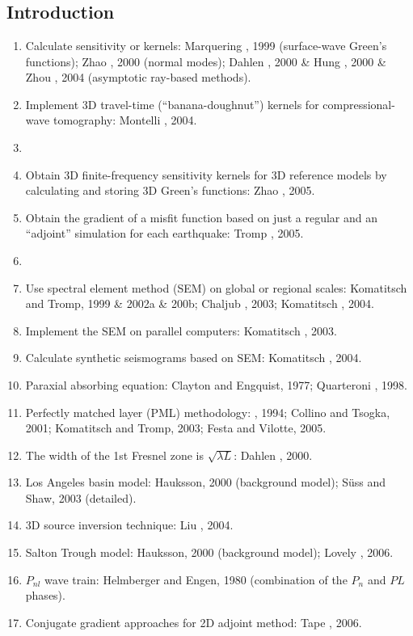 \renewcommand{\pmk}{Liu\_2006\_BSSA\_Finite-frequency kernels}
\renewcommand{\prf}{FWI/\pmk.pdf}
\renewcommand{\pti}{Finite-frequency kernels based on adjoint methods}
\renewcommand{\pay}{Qinya Liu and Jeroen Tromp, 2006}
\renewcommand{\pjo}{Bulletin of the Seismological Society of America}
\renewcommand{\pda}{2016/12/23 Fri.}

\section{\pinfo}
\subsection{Introduction}
\begin{enumerate}[\hspace{10mm}*]
  \item Calculate sensitivity or \Frechet kernels:
    Marquering \etal, 1999 (surface-wave Green's functions);
    Zhao \etal, 2000 (normal modes);
    Dahlen \etal, 2000 \& Hung \etal, 2000 \& Zhou \etal, 2004 (asymptotic ray-based methods).
  \item Implement 3D travel-time (``banana-doughnut'') kernels for compressional-wave tomography:
    Montelli \etal, 2004.
  \item \sline
  \item Obtain 3D finite-frequency sensitivity kernels for 3D reference models
    by calculating and storing 3D Green's functions: Zhao \etal, 2005.
  \item Obtain the gradient of a misfit function based on
    just a regular and an ``adjoint'' simulation for each earthquake: Tromp \etal, 2005.
  \item \sline
  \item Use spectral element method (SEM) on global or regional scales:
    Komatitsch and Tromp, 1999 \& 2002a \& 200b; Chaljub \etal, 2003; Komatitsch \etal, 2004.
  \item Implement the SEM on parallel computers: Komatitsch \etal, 2003.
  \item Calculate synthetic seismograms based on SEM: Komatitsch \etal, 2004.
  \item Paraxial absorbing equation: Clayton and Engquist, 1977; Quarteroni \etal, 1998.
  \item Perfectly matched layer (PML) methodology: \Berenger, 1994; Collino and Tsogka, 2001;
    Komatitsch and Tromp, 2003; Festa and Vilotte, 2005.
  \item The width of the 1st Fresnel zone is $\sqrt{\lambda L}$: Dahlen \etal, 2000.
  \item Los Angeles basin model: Hauksson, 2000 (background model); S\"{u}ss and Shaw, 2003 (detailed).
  \item 3D source inversion technique: Liu \etal, 2004.
  \item Salton Trough model: Hauksson, 2000 (background model); Lovely \etal, 2006.
  \item $P_{nl}$ wave train: Helmberger and Engen, 1980 (combination of the $P_n$ and $PL$ phases).
  \item Conjugate gradient approaches for 2D adjoint method: Tape \etal, 2006.
\end{enumerate}

